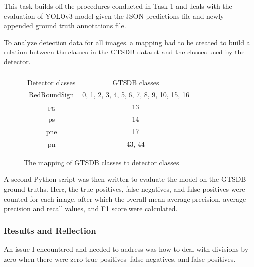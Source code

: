 \documentclass{article}
\begin{document}
            This task builds off the procedures conducted in Task 1 and deals with the evaluation of YOLOv3 model given the JSON predictions file and newly appended ground truth annotations file.
            
            To analyze detection data for all images, a mapping had to be created to build a relation between the classes in the GTSDB dataset and the classes used by the detector. 
            
            \begin{figure}[h!]
                \centering
                \begin{tabular}{c|c}
                    & \\
                    Detector classes & GTSDB classes \\
                    \hline
                    RedRoundSign & 0, 1, 2, 3, 4, 5, 6, 7, 8, 9, 10, 15, 16 \\
                    
                    pg & 13 \\
                    
                    ps & 14 \\
                    
                    pne & 17 \\
                    
                    pn & 43, 44 \\
                    
                \end{tabular}
                \caption{The mapping of GTSDB classes to detector classes}
            \end{figure}

            A second Python script was then written to evaluate the model on the GTSDB ground truths. Here, the true positives, false negatives, and false positives were counted for each image, after which the overall mean average precision, average precision and recall values, and F1 score were calculated. 
            
            \subsubsection{Results and Reflection}
                
                An issue I encountered and needed to address was how to deal with divisions by zero when there were zero true positives, false negatives, and false positives.
                
\end{document}

